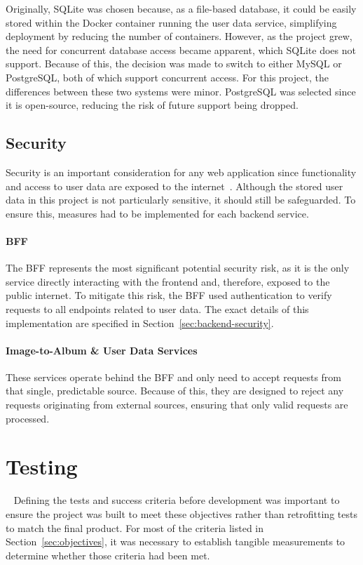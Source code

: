 Originally, SQLite was chosen because, as a file-based database, it could be easily stored within the Docker container running the user data service, simplifying deployment by reducing the number of containers. However, as the project grew, the need for concurrent database access became apparent, which SQLite does not support. Because of this, the decision was made to switch to either MySQL or PostgreSQL, both of which support concurrent access. For this project, the differences between these two systems were minor. PostgreSQL was selected since it is open-source, reducing the risk of future support being dropped.

\subsection{Security}
Security is an important consideration for any web application since functionality and access to user data are exposed to the internet~\cite{7980348}. Although the stored user data in this project is not particularly sensitive, it should still be safeguarded. To ensure this, measures had to be implemented for each backend service.

\paragraph{BFF} The BFF represents the most significant potential security risk, as it is the only service directly interacting with the frontend and, therefore, exposed to the public internet. To mitigate this risk, the BFF used authentication to verify requests to all endpoints related to user data. The exact details of this implementation are specified in Section~\ref{sec:backend-security}.

\paragraph{Image-to-Album \& User Data Services} These services operate behind the BFF and only need to accept requests from that single, predictable source. Because of this, they are designed to reject any requests originating from external sources, ensuring that only valid requests are processed.

\section{Testing}~\label{sec:test-design}
Defining the tests and success criteria before development was important to ensure the project was built to meet these objectives rather than retrofitting tests to match the final product. For most of the criteria listed in Section~\ref{sec:objectives}, it was necessary to establish tangible measurements to determine whether those criteria had been met.

